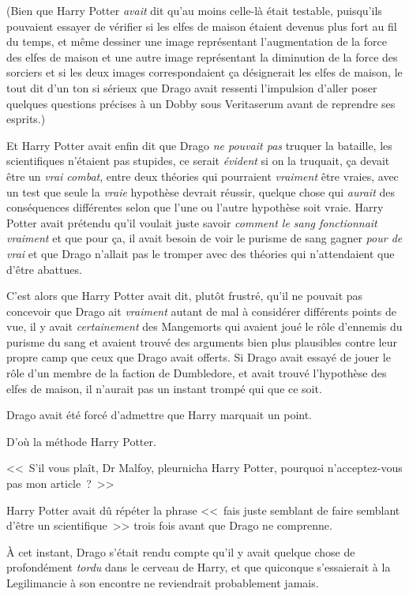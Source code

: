 (Bien que Harry Potter \emph{avait} dit qu'au moins celle-là était testable, puisqu'ils pouvaient essayer de vérifier si les elfes de maison étaient devenus plus fort au fil du temps, et même dessiner une image représentant l'augmentation de la force des elfes de maison et une autre image représentant la diminution de la force des sorciers et si les deux images correspondaient ça désignerait les elfes de maison, le tout dit d'un ton si sérieux que Drago avait ressenti l'impulsion d'aller poser quelques questions précises à un Dobby sous Veritaserum avant de reprendre ses esprits.)

Et Harry Potter avait enfin dit que Drago \emph{ne pouvait pas} truquer la bataille, les scientifiques n'étaient pas stupides, ce serait \emph{évident} si on la truquait, ça devait être un \emph{vrai combat}, entre deux théories qui pourraient \emph{vraiment} être vraies, avec un test que seule la \emph{vraie} hypothèse devrait réussir, quelque chose qui \emph{aurait} des conséquences différentes selon que l'une ou l'autre hypothèse soit vraie. Harry Potter avait prétendu qu'il voulait juste savoir \emph{comment le sang fonctionnait vraiment} et que pour ça, il avait besoin de voir le purisme de sang gagner \emph{pour de vrai} et que Drago n'allait pas le tromper avec des théories qui n'attendaient que d'être abattues.

C'est alors que Harry Potter avait dit, plutôt frustré, qu'il ne pouvait pas concevoir que Drago ait \emph{vraiment} autant de mal à considérer différents points de vue, il y avait \emph{certainement} des Mangemorts qui avaient joué le rôle d'ennemis du purisme du sang et avaient trouvé des arguments bien plus plausibles contre leur propre camp que ceux que Drago avait offerts. Si Drago avait essayé de jouer le rôle d'un membre de la faction de Dumbledore, et avait trouvé l'hypothèse des elfes de maison, il n'aurait pas un instant trompé qui que ce soit.

Drago avait été forcé d'admettre que Harry marquait un point.

D'où la méthode Harry Potter.

<<~S'il vous plaît, Dr Malfoy, pleurnicha Harry Potter, pourquoi n'acceptez-vous pas mon article~?~>>

Harry Potter avait dû répéter la phrase <<~fais juste semblant de faire semblant d'être un scientifique~>> trois fois avant que Drago ne comprenne.

À cet instant, Drago s'était rendu compte qu'il y avait quelque chose de profondément \emph{tordu} dans le cerveau de Harry, et que quiconque s'essaierait à la Legilimancie à son encontre ne reviendrait probablement jamais.

